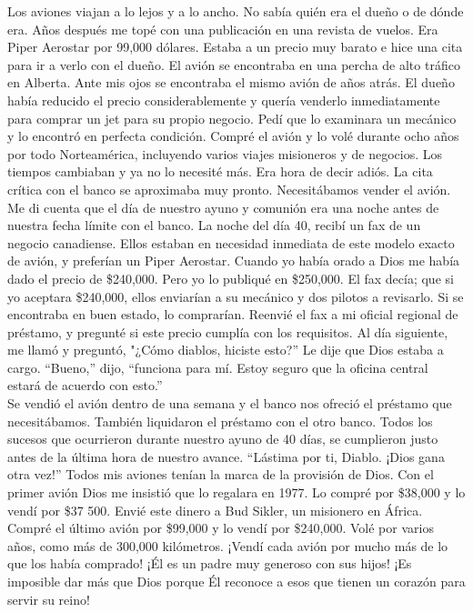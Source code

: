 \documentclass[twoside, 12pt]{book}
\begin{document}
Los aviones viajan a lo lejos y a lo ancho. No sabía quién era el dueño o de dónde era. Años después me topé con una publicación en una revista de vuelos. Era Piper Aerostar por 99,000 dólares. Estaba a un precio muy barato e hice una cita para ir a verlo con el dueño.
El avión se encontraba en una percha de alto tráfico en Alberta. Ante mis ojos se encontraba el mismo avión de años atrás. El dueño había reducido el precio considerablemente y quería venderlo inmediatamente para comprar un jet para su propio negocio. Pedí que lo examinara un mecánico y lo encontró en perfecta condición. Compré el avión y lo volé durante ocho años por todo Norteamérica, incluyendo varios viajes misioneros y de negocios. Los tiempos cambiaban y ya no lo necesité más. Era hora de decir adiós. La cita crítica con el banco se aproximaba muy pronto. Necesitábamos vender el avión. Me di cuenta que el día de nuestro ayuno y comunión era una noche antes de nuestra fecha límite con el banco. La noche del día 40, recibí un fax de un negocio canadiense. Ellos estaban en necesidad inmediata de este modelo exacto de avión, y preferían un Piper Aerostar. Cuando yo había orado a Dios me había dado el precio de \$240,000. Pero yo lo publiqué en \$250,000. El fax decía; que si yo aceptara \$240,000, ellos enviarían a su mecánico y dos pilotos a revisarlo. Si se encontraba en buen estado, lo comprarían. Reenvié el fax a mi oficial regional de préstamo, y pregunté si este precio cumplía con los requisitos. Al día siguiente, me llamó y preguntó, "¿Cómo diablos, hiciste esto?” Le dije que Dios estaba a cargo. “Bueno,” dijo, “funciona para mí. Estoy seguro que la oficina central estará de acuerdo con esto.”\\

Se vendió el avión dentro de una semana y el banco nos ofreció el préstamo que necesitábamos. También liquidaron el préstamo con el otro banco. Todos los sucesos que ocurrieron durante nuestro ayuno de 40 días, se cumplieron justo antes de la última hora de nuestro avance. “Lástima por ti, Diablo. ¡Dios gana otra vez!” Todos mis aviones tenían la marca de la provisión de Dios. Con el primer avión Dios me insistió que lo regalara en 1977. Lo compré por \$38,000 y lo vendí por \$37 500. Envié este dinero a Bud Sikler, un misionero en África. Compré el último avión por \$99,000 y lo vendí por \$240,000. Volé por varios años, como más de 300,000 kilómetros. ¡Vendí cada avión por mucho más de lo que los había comprado! ¡Él es un padre muy generoso con sus hijos! ¡Es imposible dar más que Dios porque Él reconoce a esos que tienen un corazón para servir su reino!\\
\end{document}
